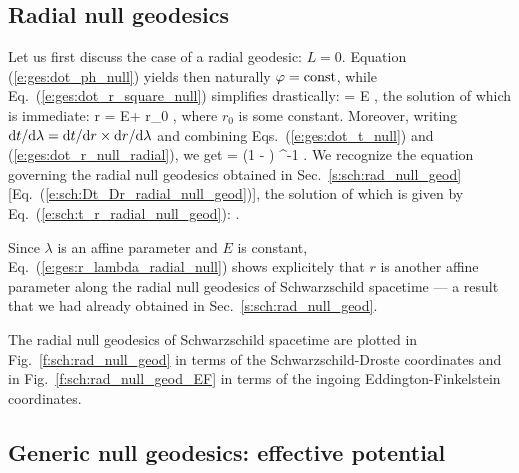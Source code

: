 \subsection{Radial null geodesics}

Let us first discuss the case of a radial geodesic: $L=0$.
Equation (\ref{e:ges:dot_ph_null}) yields then naturally $\varphi=\mathrm{const}$,
while Eq.~(\ref{e:ges:dot_r_square_null}) simplifies drastically:
\be \label{e:ges:dot_r_null_radial}
     = \pm E ,
\ee
the solution of which is immediate:
\be \label{e:ges:r_lambda_radial_null}
    r = \pm E\lambda + r_0 ,
\ee
where $r_0$ is some constant.
Moreover, writing $\mathrm{d} t/\mathrm{d}\lambda = \mathrm{d} t/\mathrm{d} r \times \mathrm{d} r/\mathrm{d}\lambda$
and combining Eqs.~(\ref{e:ges:dot_t_null}) and (\ref{e:ges:dot_r_null_radial}),
we get
\be
     = \pm \left(1 -  \right) ^{-1} .
\ee
We recognize the equation governing the radial null geodesics obtained in
Sec.~\ref{s:sch:rad_null_geod} [Eq.~(\ref{e:sch:Dt_Dr_radial_null_geod})],
the solution of which is given by Eq.~(\ref{e:sch:t_r_radial_null_geod}):
\be
   .
\ee

\begin{remark}
Since $\lambda$ is an affine parameter and $E$ is constant,
Eq.~(\ref{e:ges:r_lambda_radial_null})
shows explicitely that $r$ is another affine parameter along the radial null
geodesics of Schwarzschild spacetime --- a result that we had already
obtained in Sec.~\ref{s:sch:rad_null_geod}.
\end{remark}

The radial null geodesics of Schwarzschild spacetime are plotted in
Fig.~\ref{f:sch:rad_null_geod} in terms of the Schwarzschild-Droste coordinates
and in Fig.~\ref{f:sch:rad_null_geod_EF} in terms of the ingoing Eddington-Finkelstein coordinates.



\subsection{Generic null geodesics: effective potential}
\label{s:ges:null_eff_pot}

